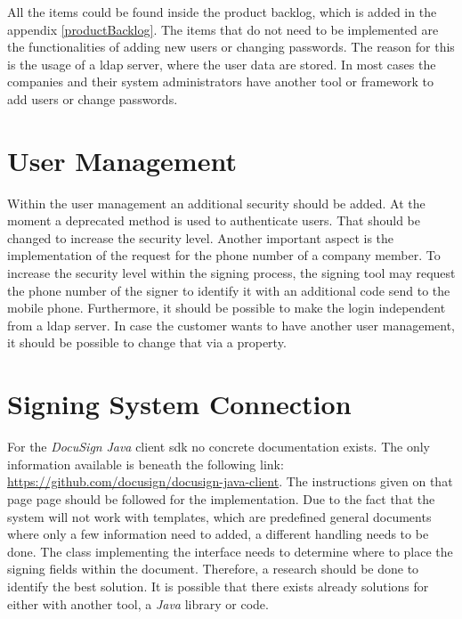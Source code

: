 All the items could be found inside the product backlog, which is added in the appendix \ref{productBacklog}. The items that do not need to be implemented are the functionalities of adding new users or changing passwords. The reason for this is the usage of a \gls{ldap} server, where the user data are stored. In most cases the companies and their system administrators have another tool or framework to add users or change passwords.


\section{User Management}

Within the user management an additional security should be added. At the moment a deprecated method is used to authenticate users. That should be changed to increase the security level. \newline
Another important aspect is the implementation of the request for the phone number of a company member. To increase the security level within the signing process, the signing tool may request the phone number of the signer to identify it with an additional code send to the mobile phone. \newline
Furthermore, it should be possible to make the login independent from a \gls{ldap} server. In case the customer wants to have another user management, it should be possible to change that via a property. 


\section{Signing System Connection}

For the \textit{DocuSign} \textit{Java} client \gls{sdk} no concrete documentation exists. The only information available is beneath the following link: \url{https://github.com/docusign/docusign-java-client}. The instructions given on that page page should be followed for the implementation. Due to the fact that the system will not work with templates, which are predefined general documents where only a few information need to added, a different handling needs to be done. \newline
The class implementing the interface needs to determine where to place the signing fields within the document. Therefore, a research should be done to identify the best solution. It is possible that there exists already solutions for either with another tool, a \textit{Java} library or code.  